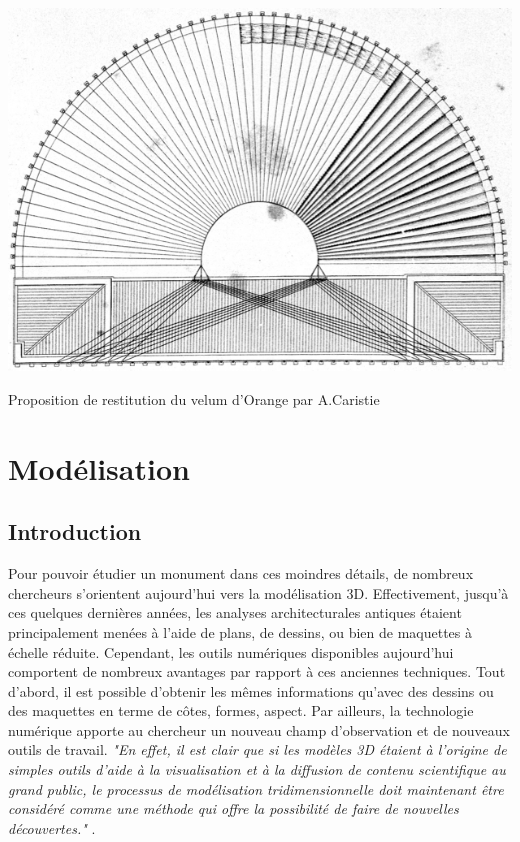 \begin{figureth}
		\includegraphics[width=\linewidth]{images/velumCaristie}
		\caption[Velum]{Proposition de restitution du velum d'Orange par A.Caristie}
		\label{velumCaristie}
\end{figureth}		















\chapter{Modélisation}
		\minitoc
		\newpage
		
		\section{Introduction}
		Pour pouvoir étudier un monument dans ces moindres détails, de nombreux chercheurs s'orientent aujourd'hui vers la modélisation 3D. Effectivement, jusqu'à ces quelques dernières années, les analyses architecturales antiques étaient principalement menées à l'aide de plans, de dessins, ou bien de maquettes à échelle réduite. Cependant, les outils numériques disponibles aujourd'hui comportent de nombreux avantages par rapport à ces anciennes techniques. Tout d'abord, il est possible d'obtenir les mêmes informations qu'avec des dessins ou des maquettes en terme de côtes, formes, aspect. Par ailleurs, la technologie numérique apporte au chercheur un nouveau champ d'observation et de nouveaux outils de travail. \textit{"En effet, il est clair que si les modèles 3D étaient à l’origine de simples outils d’aide à la visualisation et à la diffusion de contenu scientifique au grand public, le processus de modélisation tridimensionnelle doit maintenant être considéré comme une méthode qui offre la possibilité de faire de nouvelles découvertes."} \cite{rocheleau}.
		

